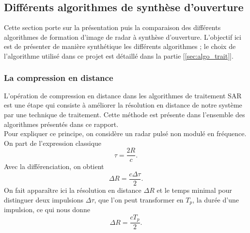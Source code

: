 \subsection{Différents algorithmes de synthèse d'ouverture}\label{subsec:algo_traitement}
Cette section porte sur la présentation puis la comparaison des différents algorithmes de formation d'image de radar à synthèse d'ouverture. L'objectif ici est de présenter de manière synthétique les différents algorithmes ; le choix de l'algorithme utilisé dans ce projet est détaillé dans la partie [\ref{sec:algo_trait}].

\subsubsection{La compression en distance} \label{subsubsec:compression_dist}
L'opération de compression en distance dans les algorithmes de traitement SAR est une étape qui consiste à améliorer la résolution en distance de notre système par une technique de traitement. Cette méthode est présente dans l'ensemble des algorithmes présentés dans ce rapport. \\
Pour expliquer ce principe, on considère un radar pulsé non modulé en fréquence.
\noindent On part de l'expression classique
\[
\tau = \frac{2R}{c}.
\]
\noindent Avec la différenciation, on obtient
\[
\Delta R = \frac{c \Delta \tau}{2}. 
\]
\noindent On fait apparaître ici la résolution en distance $\Delta R$ et le temps minimal pour distinguer deux impulsions $\Delta \tau$, que l'on peut transformer en $T_p$, la durée d'une impulsion, ce qui nous donne
\begin{equation}
\label{eq: delta_r}
    \Delta R = \frac{c T_p}{2}. 
\end{equation}

